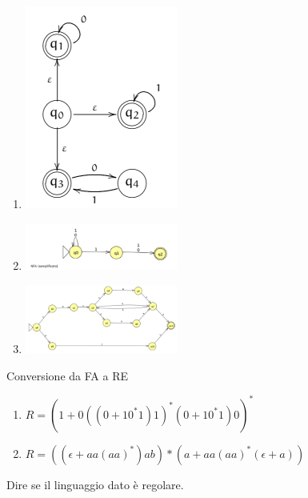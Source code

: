 \documentclass[a4paper,11pt]{article}
\begin{document}
    \begin{enumerate}
        \item \begin{minipage}{\linewidth}
            \centering
            \includegraphics[width=5cm]{Lez2retodfa1.png}
        \end{minipage}
        \item \begin{minipage}{\linewidth}
            \centering
            \includegraphics[width=5cm]{Lez2retodfa2.png}
        \end{minipage}
        \item \begin{minipage}{\linewidth}
            \centering
            \includegraphics[width=5cm]{Lez2retodfa3.png}
        \end{minipage}
    \end{enumerate}
    Conversione da FA a RE
    \begin{enumerate}
        \item $R=(1+0((0+10^*1)1)^*(0+10^*1)0)^*$
        \item $R=((\epsilon+aa(aa)^*)ab)*(a+aa(aa)^*(\epsilon+a))$
    \end{enumerate}
    Dire se il linguaggio dato è regolare.
\end{document}
